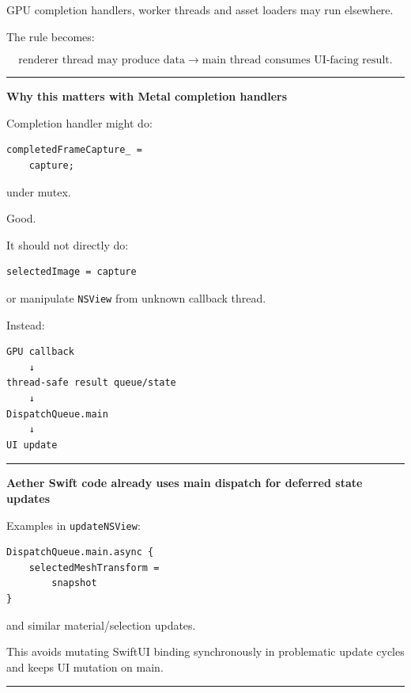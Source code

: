 GPU completion handlers, worker threads and asset loaders may run elsewhere.

The rule becomes:

\[
\boxed{
\text{renderer thread may produce data}
\rightarrow
\text{main thread consumes UI-facing result}.
}
\]

\begin{center}\rule{0.5\linewidth}{0.5pt}\end{center}

\textbf{Why this matters with Metal completion handlers}

Completion handler might do:

\begin{verbatim}
completedFrameCapture_ =
    capture;
\end{verbatim}

under mutex.

Good.

It should not directly do:

\begin{verbatim}
selectedImage = capture
\end{verbatim}

or manipulate \texttt{NSView} from unknown callback thread.

Instead:

\begin{verbatim}
GPU callback
    ↓
thread-safe result queue/state
    ↓
DispatchQueue.main
    ↓
UI update
\end{verbatim}

\begin{center}\rule{0.5\linewidth}{0.5pt}\end{center}

\textbf{Aether Swift code already uses main dispatch for deferred state updates}

Examples in \texttt{updateNSView}:

\begin{verbatim}
DispatchQueue.main.async {
    selectedMeshTransform =
        snapshot
}
\end{verbatim}

and similar material/selection updates.

This avoids mutating SwiftUI binding synchronously in problematic update cycles and keeps UI mutation on main.

\begin{center}\rule{0.5\linewidth}{0.5pt}\end{center}


